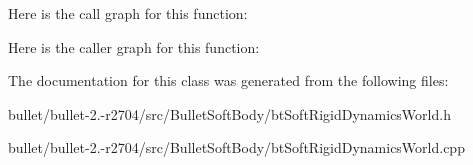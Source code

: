 Here is the call graph for this function\+:




Here is the caller graph for this function\+:




The documentation for this class was generated from the following files\+:\begin{DoxyCompactItemize}
\item 
bullet/bullet-\/2.-\/r2704/src/\+Bullet\+Soft\+Body/bt\+Soft\+Rigid\+Dynamics\+World.\+h\item 
bullet/bullet-\/2.-\/r2704/src/\+Bullet\+Soft\+Body/bt\+Soft\+Rigid\+Dynamics\+World.\+cpp\end{DoxyCompactItemize}
